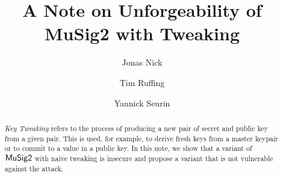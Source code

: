 \documentclass[a4paper,orivec,oribibl,english]{llncs}
\begin{document}
\author{
  Jonas Nick \and
  Tim Ruffing \and
  Yannick Seurin
 }

\title{
    A Note on Unforgeability of MuSig2 with Tweaking
}
\maketitle

\begin{abstract}
\emph{Key Tweaking} refers to the process of producing a new pair of secret and public key from a given pair.
This is used, for example, to derive fresh keys from a master keypair or to commit to a value in a public key.
In this note, we show that a variant of $\mathsf{MuSig2}$ with naive tweaking is insecure and propose a variant that is not vulnerable against the attack.

\end{abstract}
\end{document}
